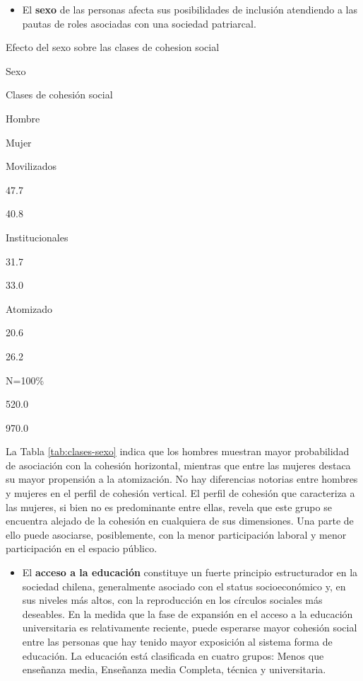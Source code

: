 \documentclass[
  12pt,
]{book}
\providecommand{\tightlist}{%
  \setlength{\itemsep}{0pt}\setlength{\parskip}{0pt}}
\begin{document}
\begin{itemize}
\tightlist
\item
  El \textbf{sexo} de las personas afecta sus posibilidades de inclusión atendiendo a las pautas de roles asociadas con una sociedad patriarcal.
\end{itemize}

\label{tab:clases-sexo}Efecto del sexo sobre las clases de cohesion social

Sexo

Clases de cohesión social

Hombre

Mujer

Movilizados

47.7

40.8

Institucionales

31.7

33.0

Atomizado

20.6

26.2

N=100\%

520.0

970.0

La Tabla \ref{tab:clases-sexo} indica que los hombres muestran mayor probabilidad de asociación con la cohesión horizontal, mientras que entre las mujeres destaca su mayor propensión a la atomización. No hay diferencias notorias entre hombres y mujeres en el perfil de cohesión vertical. El perfil de cohesión que caracteriza a las mujeres, si bien no es predominante entre ellas, revela que este grupo se encuentra alejado de la cohesión en cualquiera de sus dimensiones. Una parte de ello puede asociarse, posiblemente, con la menor participación laboral y menor participación en el espacio público.

\begin{itemize}
\tightlist
\item
  El \textbf{acceso a la educación} constituye un fuerte principio estructurador en la sociedad chilena, generalmente asociado con el status socioeconómico y, en sus niveles más altos, con la reproducción en los círculos sociales más deseables. En la medida que la fase de expansión en el acceso a la educación universitaria es relativamente reciente, puede esperarse mayor cohesión social entre las personas que hay tenido mayor exposición al sistema forma de educación. La educación está clasificada en cuatro grupos: Menos que enseñanza media, Enseñanza media Completa, técnica y universitaria.
\end{itemize}
\end{document}
